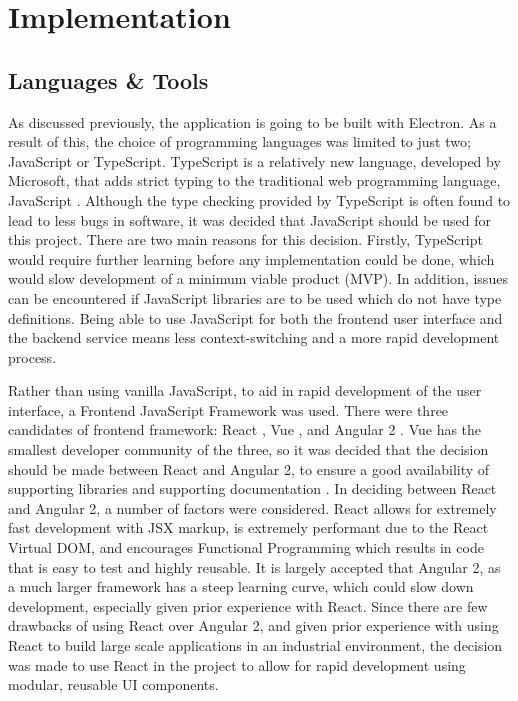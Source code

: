 \chapter{Implementation}


\section{Languages \& Tools}\label{sec:languages-tools}
As discussed previously, the application is going to be built with Electron. As a result of this, the choice of programming languages was limited to just two; JavaScript or TypeScript. TypeScript is a relatively new language, developed by Microsoft, that adds strict typing to the traditional web programming language, JavaScript \cite{typescript}. Although the type checking provided by TypeScript is often found to lead to less bugs in software, it was decided that JavaScript should be used for this project. There are two main reasons for this decision. Firstly, TypeScript would require further learning before any implementation could be done, which would slow development of a minimum viable product (MVP). In addition, issues can be encountered if JavaScript libraries are to be used which do not have type definitions. Being able to use JavaScript for both the frontend user interface and the backend service means less context-switching and a more rapid development process.

Rather than using vanilla JavaScript, to aid in rapid development of the user interface, a Frontend JavaScript Framework was used.  There were three candidates of frontend framework: React \cite{react}, Vue \cite{vue}, and Angular 2 \cite{angular}. Vue has the smallest developer community of the three, so it was decided that the decision should be made between React and Angular 2, to ensure a good availability of supporting libraries and supporting documentation \cite{so-dev-survey}. In deciding between React and Angular 2, a number of factors were considered. React allows for extremely fast development with JSX markup, is extremely performant due to the React Virtual DOM, and encourages Functional Programming which results in code that is easy to test and highly reusable. It is largely accepted that Angular 2, as a much larger framework has a steep learning curve, which could slow down development, especially given prior experience with React. Since there are few drawbacks of using React over Angular 2, and given prior experience with using React to build large scale applications in an industrial environment, the decision was made to use React in the project to allow for rapid development using modular, reusable UI components.

